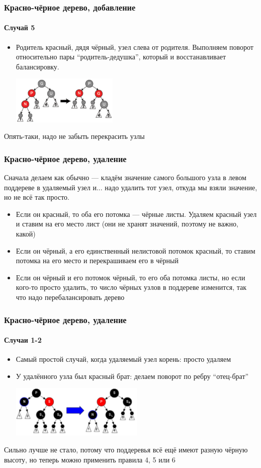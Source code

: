 \documentclass[xetex,mathserif,serif]{beamer}
\begin{document}
	\begin{frame}
		\frametitle{Красно-чёрное дерево, добавление}
		\framesubtitle{Случай 5}
		\begin{itemize}
			\item Родитель красный, дядя чёрный, узел слева от родителя. Выполняем поворот относительно пары ``родитель-дедушка'', который и восстанавливает балансировку.
			\begin{center}
				\includegraphics[width=0.4\textwidth]{redBlackAdding3.png}
			\end{center}
		\end{itemize}
		Опять-таки, надо не забыть перекрасить узлы
	\end{frame}

	\begin{frame}
		\frametitle{Красно-чёрное дерево, удаление}
		Сначала делаем как обычно --- кладём значение самого большого узла в левом поддереве в удаляемый узел и... надо удалить тот узел, откуда мы взяли значение, но не всё так просто.
		\begin{itemize}
			\item Если он красный, то оба его потомка --- чёрные листы. Удаляем красный узел и ставим на его место лист (они не хранят значений, поэтому не важно, какой)
			\item Если он чёрный, а его единственный нелистовой потомок красный, то ставим потомка на его место и перекрашиваем его в чёрный
			\item Если он чёрный и его потомок чёрный, то его оба потомка листы, но если кого-то просто удалить, то число чёрных узлов в поддереве изменится, так что надо перебалансировать дерево
		\end{itemize}
	\end{frame}

	\begin{frame}
		\frametitle{Красно-чёрное дерево, удаление}
		\framesubtitle{Случаи 1-2}
		\begin{itemize}
			\item Самый простой случай, когда удаляемый узел корень: просто удаляем
			\item У удалённого узла был красный брат: делаем поворот по ребру ``отец-брат''
			\begin{center}
				\includegraphics[width=0.5\textwidth]{redBlackRemoval1.png}
			\end{center}
		\end{itemize}
		Сильно лучше не стало, потому что поддеревья всё ещё имеют разную чёрную высоту, но теперь можно применить правила 4, 5 или 6
	\end{frame}
\end{document}
